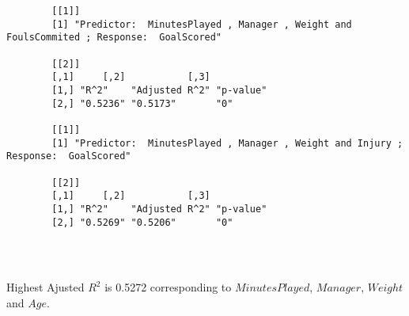 \documentclass[12pt]{article}
\begin{document}
\begin{verbatim}
		[[1]]
		[1] "Predictor:  MinutesPlayed , Manager , Weight and FoulsCommited ; Response:  GoalScored"
		
		[[2]]
		[,1]     [,2]           [,3]     
		[1,] "R^2"    "Adjusted R^2" "p-value"
		[2,] "0.5236" "0.5173"       "0"      
		
		[[1]]
		[1] "Predictor:  MinutesPlayed , Manager , Weight and Injury ; Response:  GoalScored"
		
		[[2]]
		[,1]     [,2]           [,3]     
		[1,] "R^2"    "Adjusted R^2" "p-value"
		[2,] "0.5269" "0.5206"       "0"      
		
		
		
	\end{verbatim}
	
	Highest Ajusted $ R^2 $ is 0.5272 corresponding to $ MinutesPlayed $, $ Manager $, $ Weight $ and $ Age $.
	
\end{document}
